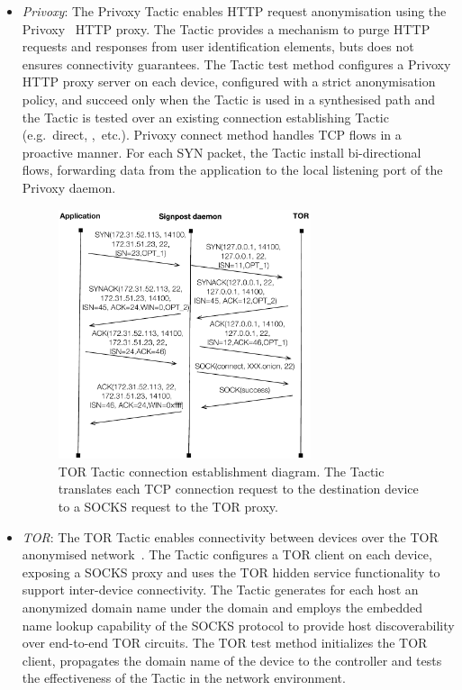 \begin{itemize}
  \item \emph{Privoxy}: The Privoxy Tactic enables HTTP request anonymisation using the
    Privoxy~ HTTP proxy. The Tactic provides a mechanism to purge
    HTTP requests and responses from user identification elements, buts does not
    ensures connectivity guarantees. The Tactic test method
    configures a Privoxy HTTP proxy server on each device, configured with a
    strict anonymisation policy, and succeed only when the Tactic is used in a
    synthesised path and the Tactic is tested over an existing connection
    establishing Tactic (e.g.~direct, \openvpn,~etc.).  Privoxy connect method
    handles TCP flows in a proactive manner.  For each
    SYN packet, the Tactic install bi-directional flows, forwarding data from
    the application to the local listening port of the Privoxy daemon.

\begin{figure}
  \begin{center}
	\includegraphics[width=0.7\textwidth]{Chapter3/Chapter3Figs/tor-example}
  \end{center}
  \caption[TOR Tactic connection establishment sequence diagram.]{TOR Tactic
    connection establishment diagram. The Tactic translates each
    TCP connection request to the destination device to a SOCKS
    request to the TOR proxy.}\label{fig:signpost:tor-example}
\end{figure}
  
  \item \emph{TOR}: The TOR Tactic enables connectivity between devices over the
    TOR anonymised network~. The Tactic configures a TOR
    client on each device, exposing a SOCKS proxy and uses the TOR hidden
    service functionality to support inter-device connectivity. The Tactic
    generates for each host an anonymized domain name under the 
    domain and employs the embedded name lookup capability of the SOCKS protocol
    to provide host discoverability over end-to-end TOR circuits. The TOR test
    method initializes the TOR client, propagates the domain name of the device
    to the \signpost controller and tests the effectiveness of the Tactic in the network
    environment.  
    

\end{itemize}
